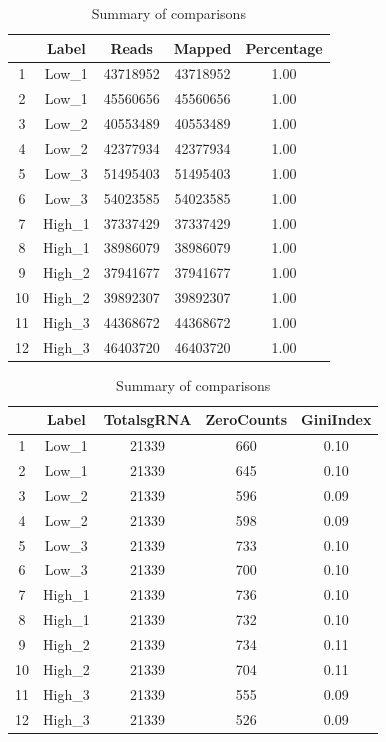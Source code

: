 \documentclass{article}
\begin{document}
\begin{table}[ht]
\centering
\begin{tabular}{ccccc}
  \hline
 & Label & Reads & Mapped & Percentage \\ 
  \hline
1 & Low\_1 & 43718952 & 43718952 & 1.00 \\ 
  2 & Low\_1 & 45560656 & 45560656 & 1.00 \\ 
  3 & Low\_2 & 40553489 & 40553489 & 1.00 \\ 
  4 & Low\_2 & 42377934 & 42377934 & 1.00 \\ 
  5 & Low\_3 & 51495403 & 51495403 & 1.00 \\ 
  6 & Low\_3 & 54023585 & 54023585 & 1.00 \\ 
  7 & High\_1 & 37337429 & 37337429 & 1.00 \\ 
  8 & High\_1 & 38986079 & 38986079 & 1.00 \\ 
  9 & High\_2 & 37941677 & 37941677 & 1.00 \\ 
  10 & High\_2 & 39892307 & 39892307 & 1.00 \\ 
  11 & High\_3 & 44368672 & 44368672 & 1.00 \\ 
  12 & High\_3 & 46403720 & 46403720 & 1.00 \\ 
   \hline
\end{tabular}
\caption{Summary of comparisons} 
\label{tab:one}
\end{table}
\begin{table}[ht]
\centering
\begin{tabular}{ccccc}
  \hline
 & Label & TotalsgRNA & ZeroCounts & GiniIndex \\ 
  \hline
1 & Low\_1 & 21339 & 660 & 0.10 \\ 
  2 & Low\_1 & 21339 & 645 & 0.10 \\ 
  3 & Low\_2 & 21339 & 596 & 0.09 \\ 
  4 & Low\_2 & 21339 & 598 & 0.09 \\ 
  5 & Low\_3 & 21339 & 733 & 0.10 \\ 
  6 & Low\_3 & 21339 & 700 & 0.10 \\ 
  7 & High\_1 & 21339 & 736 & 0.10 \\ 
  8 & High\_1 & 21339 & 732 & 0.10 \\ 
  9 & High\_2 & 21339 & 734 & 0.11 \\ 
  10 & High\_2 & 21339 & 704 & 0.11 \\ 
  11 & High\_3 & 21339 & 555 & 0.09 \\ 
  12 & High\_3 & 21339 & 526 & 0.09 \\ 
   \hline
\end{tabular}
\caption{Summary of comparisons} 
\label{tab:two}
\end{table}
\end{document}
